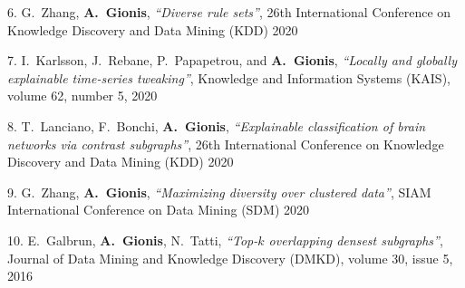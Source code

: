 \documentclass[a4paper,11pt]{article}
\begin{document}
\textbibspace

\item[{6.}]
{G.\ Zhang, \textbf{A.\ Gionis}},
{\em ``Diverse rule sets''},
26th International Conference on Knowledge Discovery and Data Mining (KDD) 2020
%
\item[]


\textbibspace

\item[{7.}]
{I.\ Karlsson, J.\ Rebane, P.\ Papapetrou, and \textbf{A.\ Gionis}}, 
{\em ``Locally and globally explainable time-series tweaking''}, 
Knowledge and Information Systems (KAIS),
volume 62, number 5, 2020

\item[]


\textbibspace

\item[{8.}]
{T.\ Lanciano, F.\ Bonchi, \textbf{A.\ Gionis}},
{\em ``Explainable classification of brain networks via contrast subgraphs''},
26th International Conference on Knowledge Discovery and Data Mining (KDD) 2020
%
\item[]


\textbibspace

\item[{9.}]
{G.\ Zhang, \textbf{A.\ Gionis}},
{\em ``Maximizing diversity over clustered data''},
SIAM International Conference on Data Mining (SDM) 2020
%
\item[]


\textbibspace

\item[{10.}]
{E.\ Galbrun, \textbf{A.\ Gionis}, N.\ Tatti}, 
{\em ``Top-$k$ overlapping densest subgraphs''}, 
Journal of Data Mining and Knowledge Discovery (DMKD), volume 30, issue 5, 2016
%
\item[]


\biblistnend

\end{document}
